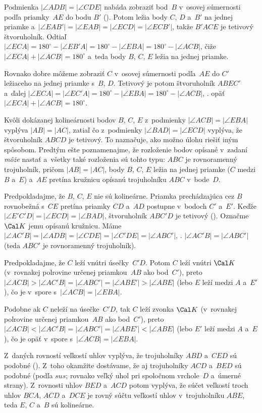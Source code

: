{%
Podmienka $|\angle ADB|=|\angle CDE|$ nabáda zobraziť bod~$B$ v~osovej súmernosti podľa priamky~$AE$ do bodu $B'$ (\obr). Potom ležia body $C$, $D$ a~$B'$ na jednej priamke a~$|\angle EAB'|=|\angle EAB|=|\angle ECD|=|\angle ECB'|$, takže $B'ACE$ je tetivový štvoruholník. Odtiaľ $|\angle ECA|=180^{\circ}-|\angle EB'A|=180^{\circ}-|\angle EBA|=180^{\circ}-|\angle ACB|$, čiže $|\angle ECA|+|\angle ACB|=180^{\circ}$ a~teda body $B$, $C$, $E$ ležia na jednej priamke.
%

\poznamky
Rovnako dobre môžeme zobraziť $C$ v~osovej súmernosti podľa~$AE$ do $C'$ ležiaceho na jednej priamke s~$B$, $D$. Tetivový je potom štvoruholník $ABEC'$ a~ďalej $|\angle ECA|=|\angle EC'A|=180^{\circ}-|\angle EBA|=180^{\circ}-|\angle
ACB|$, \tj. opäť $|\angle ECA|+|\angle ACB|=180^{\circ}$.

Kvôli dokázanej kolineárnosti bodov $B$, $C$, $E$ z~podmienky $|\angle ACB|=|\angle EBA|$ vyplýva $|AB|=|AC|$, zatiaľ čo z~podmienky $|\angle BAD|=|\angle ECD|$ vyplýva, že štvoruholník $ABCD$ je tetivový. To naznačuje, ako možno úlohu riešiť iným spôsobom. Predtým ešte poznamenajme, že rozloženie bodov opísané v~zadaní {\it môže\/} nastať a~všetky také rozloženia sú tohto typu: $ABC$ je rovnoramenný trojuholník, pričom $|AB|=|AC|$, body $B$, $C$, $E$ ležia na jednej priamke ($C$ medzi $B$ a~$E$) a~$AE$ pretína kružnicu opísanú trojuholníku $ABC$ v~bode~$D$.

\ineriesenie
Predpokladajme, že $B$, $C$, $E$ nie sú kolineárne.
Priamka prechádzajúca cez $B$ rovnobežná s~$CE$ pretína priamky $CD$ a~$AD$ postupne v~bodoch $C'$ a~$E'$. Keďže $|\angle E'C'D|=|\angle ECD|=|\angle BAD|$, štvoruholník $ABC'D$ je tetivový (\obr).
Označme $\Cal K$ jemu opísanú kružnicu.
Máme $|\angle AC'B|=|\angle ADB|=|\angle CDE|=|\angle C'DE|=|\angle ABC'|$,
\tj. $|\angle AC'B|=|\angle ABC'|$ (teda $ABC'$ je rovnoramenný trojuholník).

Predpokladajme, že $C$ leží vnútri úsečky~$C'D$. Potom $C$ leží vnútri $\Cal K$ (v~rovnakej polrovine určenej priamkou~$AB$ ako bod~$C'$), preto $|\angle ACB|>|\angle AC'B|=|\angle ABC'|=|\angle ABE'|>|\angle ABE|$
(lebo $E$ leží medzi $A$ a~$E'$), čo je v~spore s~$|\angle ACB|=|\angle EBA|$.

Podobne ak $C$ neleží na úsečke~$C'D$, tak $C$ leží zvonka $\Cal K$ (v~rovnakej polrovine určenej priamkou~$AB$ ako bod~$C'$), preto $|\angle ACB|<|\angle AC'B|=|\angle ABC'|=|\angle ABE'|<|\angle ABE|$ (lebo $E'$ leží medzi $A$ a~$E$), čo je opäť v~spore s~$|\angle ACB|=|\angle EBA|$.

\ineriesenie
{}
Z~daných rovností veľkostí uhlov vyplýva, že trojuholníky $ABD$ a~$CED$ sú podobné (\obr).
Z~toho okamžite dostávame, že aj trojuholníky $ACD$ a~$BED$ sú podobné (podľa $sus$; rovnako veľký uhol pri spoločnom vrchole~$D$ a~úmerné strany). Z~rovnosti uhlov $BED$ a~$ACD$ potom vyplýva, že súčet veľkostí troch uhlov $BCA$, $ACD$ a~$DCE$ je rovný súčtu veľkostí uhlov v~trojuholníku $ABE$, teda $E$, $C$ a~$B$ sú kolineárne.
}

